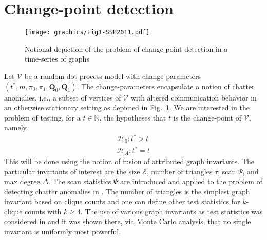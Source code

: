 \documentclass[10pt,draftclsnofoot,onecolumn]{IEEEtran}
\theoremstyle{definition}
\begin{document}
\section{Change-point detection}
\label{sec:change-point-detect}
\begin{figure}[htbp]
  \centering
  \texttt{[image: graphics/Fig1-SSP2011.pdf]}
  \caption{Notional depiction of the problem of change-point detection
    in a time-series of graphs}
  \label{fig:notional_change_point}
\end{figure}
Let $\mathscr{V}$ be a random dot process model with change-parameters
$(t^{*}, m, \pi_0, \pi_1, \mathbf{Q}_0, \mathbf{Q}_1)$. The
change-parameters encapsulate a notion of chatter anomalies, i.e., a
subset of vertices of $\mathscr{V}$ with altered communication
behavior in an otherwise stationary setting as depicted in
Fig.~\ref{fig:notional_change_point}. We are interested in the problem
of testing, for a $t \in \mathbb{N}$, the hypotheses that $t$ is the
change-point of $\mathscr{V}$, namely
\begin{gather*}
  \mathscr{H}_0 \colon t^{*} > t \\
  \mathscr{H}_A \colon t^{*} = t
\end{gather*}
This will be done using the notion of fusion of attributed graph
invariants. The particular invariants of interest are the size
$\mathcal{E}$, number of triangles $\tau$, scan $\Psi$, and max degree
$\Delta$. The scan statistics $\Psi$ are introduced and applied to the
problem of detecting chatter anomalies in
\cite{priebe05:_scan_statis_enron_graph}. The number of triangles is
the simplest graph invariant based on clique counts and one can define
other test statistics for $k$-clique counts with $k \geq 4$.  The use
of various graph invariants as test statistics was considered in
\cite{pao11:_statis_infer_random_graph} and it was shown there, via
Monte Carlo analysis, that no single invariant is uniformly most
powerful.
\end{document}
